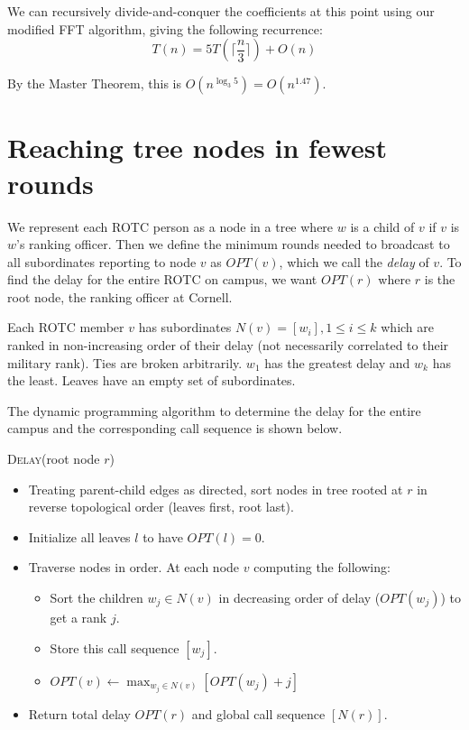 \documentclass[12pt]{article}
\begin{document}
We can recursively divide-and-conquer the coefficients at this point
using our modified FFT algorithm, giving the following recurrence:
\begin{displaymath}
T(n) = 5T(\lceil \frac{n}{3} \rceil) + O(n)
\end{displaymath}

By the Master Theorem, this is $O(n^{\log_3{5}})= O(n^{1.47})$.

\pagebreak

\setcounter{section}{1}
\section{Reaching tree nodes in fewest rounds}

We represent each ROTC person as a node in a tree where $w$ is a child
of $v$ if $v$ is $w$'s ranking officer. Then we define the minimum rounds
needed to broadcast to all subordinates reporting to node $v$ as $OPT(v)$,
which we call the \textit{delay} of $v$.
To find the
delay for the entire ROTC on campus, we want
$OPT(r)$ where $r$ is the root node, the ranking officer at Cornell.

Each ROTC member $v$ has subordinates $N(v) = [w_i], 1 \le i \le k$ which
are ranked in non-increasing order of their delay (not necessarily correlated
to their military rank). Ties are broken arbitrarily.
$w_1$ has the greatest delay and $w_k$ has the
least. Leaves have an empty set of subordinates.

The dynamic programming algorithm to determine the delay for the entire
campus and the corresponding call sequence is shown below.

\textsc{Delay}(root node $r$)
\begin{itemize}
\item
Treating parent-child edges as directed, sort nodes in tree rooted at $r$
in reverse topological order (leaves first, root last).
\item
Initialize all leaves $l$ to have $OPT(l) = 0$.
\item
Traverse nodes in order. At each node $v$ computing the following:
\begin{itemize}
\item Sort the children $w_j \in N(v)$ in decreasing order of delay ($OPT(w_j)$) to get a rank $j$.
\item Store this call sequence $[w_j]$.
\item
$OPT(v) \gets \max_{w_j \in N(v)}\left[OPT(w_j) + j\right]$
\end{itemize}
\item
Return total delay $OPT(r)$ and global call sequence $[N(r)]$.
\end{itemize}
\end{document}
